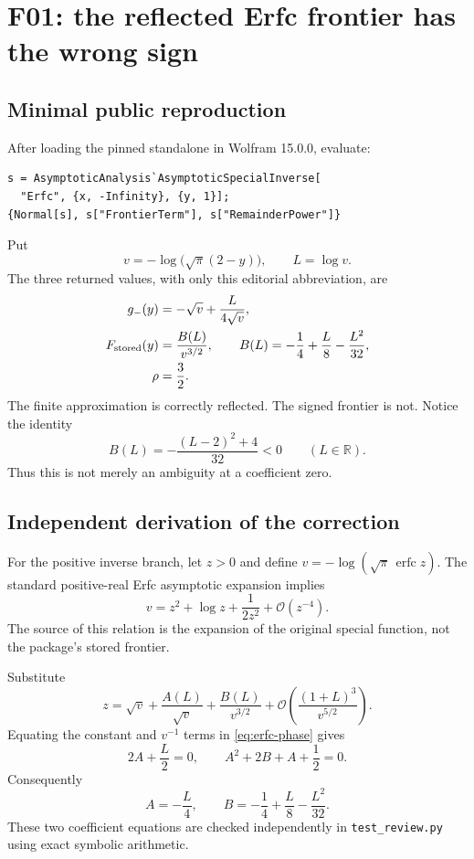 \documentclass[11pt,a4paper]{article}
\newcommand{\code}[1]{\nolinkurl{#1}}
\newcommand{\OO}{\mathcal O}
\newcommand{\erfc}{\operatorname{erfc}}
\begin{document}
\section{F01: the reflected Erfc frontier has the wrong sign}
\label{sec:erfc}

\subsection{Minimal public reproduction}

After loading the pinned standalone in Wolfram 15.0.0, evaluate:
\begin{lstlisting}
s = AsymptoticAnalysis`AsymptoticSpecialInverse[
  "Erfc", {x, -Infinity}, {y, 1}];
{Normal[s], s["FrontierTerm"], s["RemainderPower"]}
\end{lstlisting}
Put
\[
 v=-\log\bigl(\sqrt\pi(2-y)\bigr),\qquad L=\log v.
\]
The three returned values, with only this editorial abbreviation, are
\begin{align}
 g_-(y)&=-\sqrt v+\frac{L}{4\sqrt v},\label{eq:negative-kept}\\
 F_{\rm stored}(y)&=\frac{B(L)}{v^{3/2}},\qquad
 B(L)=-\frac14+\frac L8-\frac{L^2}{32},\label{eq:stored}\\
 \rho&=\frac32.
\end{align}
The finite approximation is correctly reflected. The signed frontier is not.
Notice the identity
\[
 B(L)=-\frac{(L-2)^2+4}{32}<0\qquad(L\in\mathbb R).
\]
Thus this is not merely an ambiguity at a coefficient zero.

\subsection{Independent derivation of the correction}

For the positive inverse branch, let $z>0$ and define
$v=-\log(\sqrt\pi\,\erfc z)$. The standard positive-real Erfc asymptotic
expansion implies
\begin{equation}
 v=z^2+\log z+\frac{1}{2z^2}+\OO(z^{-4}).
 \label{eq:erfc-phase}
\end{equation}
The source of this relation is the expansion of the original special
function, not the package's stored frontier.\cite{erfcasymptotic}

Substitute
\[
 z=\sqrt v+\frac{A(L)}{\sqrt v}
       +\frac{B(L)}{v^{3/2}}
       +\OO\!\left(\frac{(1+L)^3}{v^{5/2}}\right).
\]
Equating the constant and $v^{-1}$ terms in \eqref{eq:erfc-phase} gives
\[
 2A+\frac L2=0,\qquad
 A^2+2B+A+\frac12=0.
\]
Consequently
\[
 A=-\frac L4,\qquad
 B=-\frac14+\frac L8-\frac{L^2}{32}.
\]
These two coefficient equations are checked independently in
\code{test_review.py} using exact symbolic arithmetic.
\end{document}
